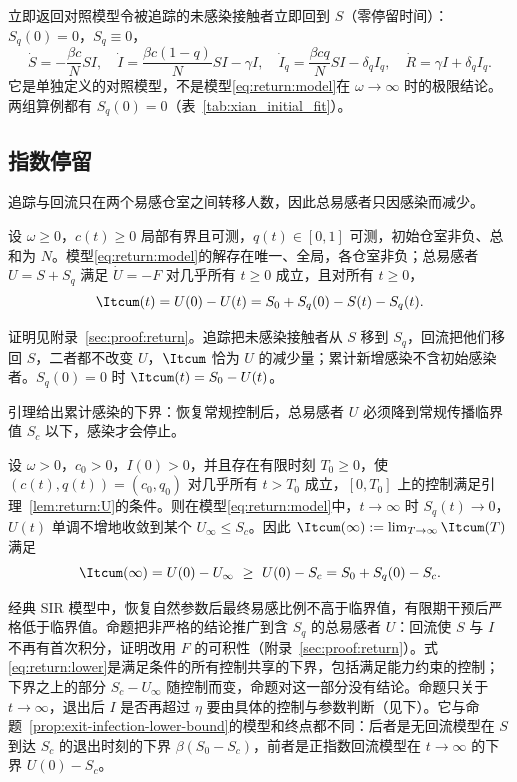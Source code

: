 立即返回对照模型令被追踪的未感染接触者立即回到 $S$（零停留时间）：$S_q(0)=0$，$S_q\equiv0$，
\begin{equation}
\dot S=-\frac{\beta c}{N}SI,\quad
\dot I=\frac{\beta c(1-q)}{N}SI-\gamma I,\quad
\dot I_q=\frac{\beta cq}{N}SI-\delta_q I_q,\quad
\dot R=\gamma I+\delta_q I_q.
\label{eq:return:immediate}
\end{equation}
它是单独定义的对照模型，不是模型\eqref{eq:return:model}在 $\omega\to\infty$ 时的极限结论。两组算例都有 $S_q(0)=0$（表~\ref{tab:xian_initial_fit}）。

\subsection{指数停留}
\label{sec:return:exp}
追踪与回流只在两个易感仓室之间转移人数，因此总易感者只因感染而减少。
\begin{lemma}
\label{lem:return:U}
设 $\omega\ge0$，$c(t)\ge0$ 局部有界且可测，$q(t)\in[0,1]$ 可测，初始仓室非负、总和为 $N$。模型\eqref{eq:return:model}的解存在唯一、全局，各仓室非负；总易感者 $U=S+S_q$ 满足 $\dot U=-F$ 对几乎所有 $t\ge0$ 成立，且对所有 $t\ge0$，
\begin{equation}
\Itcum(t)=U(0)-U(t)=S_0+S_q(0)-S(t)-S_q(t).
\label{eq:return:U}
\end{equation}
\end{lemma}
证明见附录~\ref{sec:proof:return}。追踪把未感染接触者从 $S$ 移到 $S_q$，回流把他们移回 $S$，二者都不改变 $U$，$\Itcum$ 恰为 $U$ 的减少量；累计新增感染不含初始感染者。$S_q(0)=0$ 时 $\Itcum(t)=S_0-U(t)$。

引理给出累计感染的下界：恢复常规控制后，总易感者 $U$ 必须降到常规传播临界值 $S_c$ 以下，感染才会停止。
\begin{proposition}
\label{prop:return:final-size}
设 $\omega>0$，$c_0>0$，$I(0)>0$，并且存在有限时刻 $T_0\ge0$，使 $(c(t),q(t))=(c_0,q_0)$ 对几乎所有 $t>T_0$ 成立，$[0,T_0]$ 上的控制满足引理~\ref{lem:return:U}的条件。则在模型\eqref{eq:return:model}中，$t\to\infty$ 时 $S_q(t)\to0$，$U(t)$ 单调不增地收敛到某个 $U_\infty\le S_c$。因此 $\Itcum(\infty):=\lim_{T\to\infty}\Itcum(T)$ 满足
\begin{equation}
\Itcum(\infty)=U(0)-U_\infty\ \ge\ U(0)-S_c=S_0+S_q(0)-S_c.
\label{eq:return:lower}
\end{equation}
\end{proposition}
经典 SIR 模型中，恢复自然参数后最终易感比例不高于临界值，有限期干预后严格低于临界值\cite{Ketcheson2021Finite}。命题把非严格的结论推广到含 $S_q$ 的总易感者 $U$：回流使 $S$ 与 $I$ 不再有首次积分，证明改用 $F$ 的可积性（附录~\ref{sec:proof:return}）。式\eqref{eq:return:lower}是满足条件的所有控制共享的下界，包括满足能力约束的控制；下界之上的部分 $S_c-U_\infty$ 随控制而变，命题对这一部分没有结论。命题只关于 $t\to\infty$，退出后 $I$ 是否再超过 $\eta$ 要由具体的控制与参数判断（见下）。它与命题~\ref{prop:exit-infection-lower-bound}的模型和终点都不同：后者是无回流模型在 $S$ 到达 $S_c$ 的退出时刻的下界 $\beta(S_0-S_c)$，前者是正指数回流模型在 $t\to\infty$ 的下界 $U(0)-S_c$。


